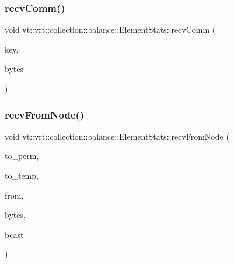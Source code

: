 \subsubsection{\texorpdfstring{recv\+Comm()}{recvComm()}}
{\footnotesize\ttfamily void vt\+::vrt\+::collection\+::balance\+::\+Element\+Stats\+::recv\+Comm (\begin{DoxyParamCaption}\item[{\hyperlink{structvt_1_1vrt_1_1collection_1_1balance_1_1_l_b_comm_key}{L\+B\+Comm\+Key}}]{key,  }\item[{double}]{bytes }\end{DoxyParamCaption})}

\mbox{\label{structvt_1_1vrt_1_1collection_1_1balance_1_1_element_stats_af251d52d4d0be99a7745295148abcb4e}} 
\subsubsection{\texorpdfstring{recv\+From\+Node()}{recvFromNode()}}
{\footnotesize\ttfamily void vt\+::vrt\+::collection\+::balance\+::\+Element\+Stats\+::recv\+From\+Node (\begin{DoxyParamCaption}\item[{\hyperlink{namespacevt_1_1vrt_1_1collection_1_1balance_a14c8d2c972f2913aa3f1636e5be0a120}{Element\+I\+D\+Type}}]{to\+\_\+perm,  }\item[{\hyperlink{namespacevt_1_1vrt_1_1collection_1_1balance_a14c8d2c972f2913aa3f1636e5be0a120}{Element\+I\+D\+Type}}]{to\+\_\+temp,  }\item[{\hyperlink{namespacevt_a866da9d0efc19c0a1ce79e9e492f47e2}{Node\+Type}}]{from,  }\item[{double}]{bytes,  }\item[{bool}]{bcast }\end{DoxyParamCaption})}

\mbox{\label{structvt_1_1vrt_1_1collection_1_1balance_1_1_element_stats_afdd59d341ddd577a4652027b132a7c06}} 
